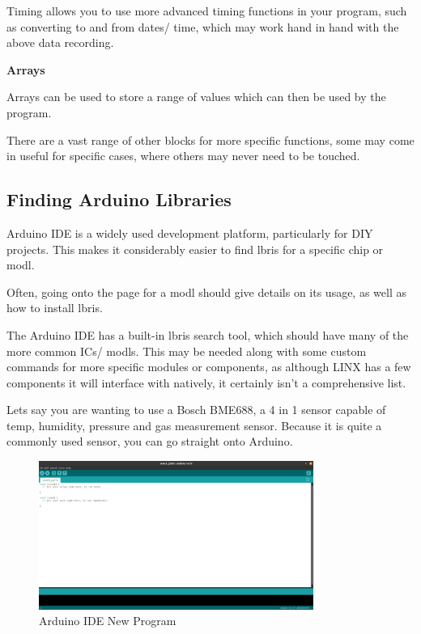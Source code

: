 \documentclass[a4paper,11pt]{report}
\begin{document}
Timing allows you to use more advanced timing functions in your program, such as converting to and from dates/ time, which may work hand in hand with the above data recording.

\textbf{Arrays}

Arrays can be used to store a range of values which can then be used by the program.

There are a vast range of other blocks for more specific functions, some may come in useful for specific cases, where others may never need to be touched.

\subsection{Finding Arduino Libraries}

Arduino IDE is a widely used development platform, particularly for DIY projects. This makes it considerably easier to find \gls{lbris} for a specific chip or \gls{modl}.

Often, going onto the page for a \gls{modl} should give details on its usage, as well as how to install \gls{lbris}.

The Arduino IDE has a built-in \gls{lbris} search tool, which should have many of the more common ICs/ \gls{modl}s. This may be needed along with some custom commands for more specific modules or components, as although LINX has a few components it will interface with natively, it certainly isn't a comprehensive list.

Lets say you are wanting to use a Bosch BME688, a 4 in 1 sensor capable of temp, humidity, pressure and gas measurement sensor. Because it is quite a commonly used sensor, you can go straight onto Arduino.

\begin{figure}[H]
\centering
\includegraphics[width=0.8\textwidth]{screenshots/arduinoidestartup}
\caption{Arduino IDE New Program}
\end{figure}
\end{document}

